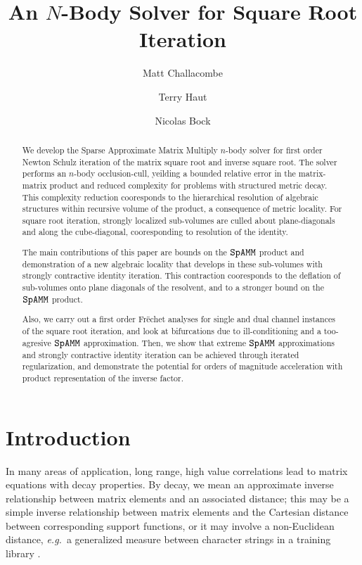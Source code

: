 \documentclass[letterpaper,twocolumn,amsmath,amsfont,amssymb,english,aps,jcp,preprintnumbers,groupaddress,nofootinbib,tightenlines,floatfix]{revtex4}
\theoremstyle{plain}
\theoremstyle{remark}
\theoremstyle{plain}
\begin{document}
\title{An $N$-Body Solver for Square Root Iteration}

\author{Matt Challacombe}

\author{Terry Haut}

\author{Nicolas Bock}


\begin{abstract}
We develop the Sparse Approximate Matrix Multiply $n$-body solver for first order Newton Schulz iteration of the 
matrix square root and inverse square root.
The solver performs an $n$-body occlusion-cull, yeilding a bounded relative error in the matrix-matrix product
and reduced complexity for problems with structured metric decay.  This complexity reduction cooresponds to 
the hierarchical resolution of algebraic structures within recursive volume of the product, a consequence of 
metric locality.  For square root iteration, strongly localized sub-volumes are  culled about 
plane-diagonals and along the cube-diagonal,  cooresponding to resolution of the identity.  

The main contributions of this paper are bounds on the $\tt SpAMM$ product and 
demonstration of a new algebraic locality that develops in these sub-volumes with strongly 
contractive identity iteration. This contraction cooresponds to the deflation of sub-volumes 
onto plane diagonals of the resolvent, and to a stronger bound on the $\tt SpAMM$ product.  

Also, we carry out a first order Fr\"{e}chet analyses for single and 
dual channel instances of the square root iteration, and look at bifurcations due to ill-conditioning and a 
too-agresive $\tt SpAMM$ approximation.  Then, we show that extreme $\tt SpAMM$ approximations and strongly contractive 
identity iteration can be achieved through iterated regularization, and demonstrate the potential for orders of magnitude 
acceleration with product representation of the inverse factor.   

\end{abstract}

\maketitle
\section{Introduction}
In many areas of application, long range, high value correlations lead to matrix equations with decay properties.
By decay, we mean an approximate inverse relationship between matrix elements and an associated distance; 
this may be a simple inverse relationship between matrix elements and the Cartesian distance between
corresponding support functions, or it may involve a non-Euclidean distance, 
 {\em  e.g.}~a generalized measure between character strings in a training library \cite{}. 
\end{document}
